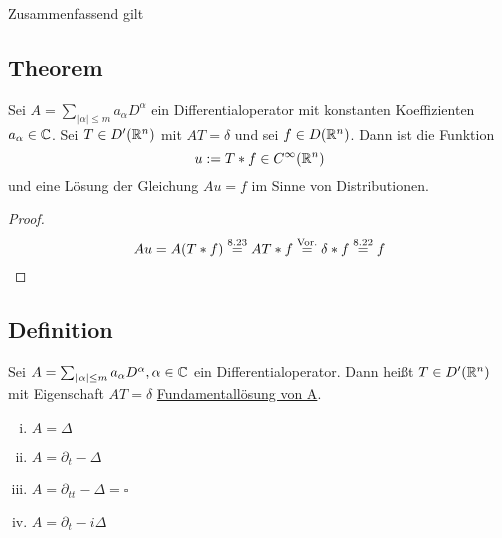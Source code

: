 Zusammenfassend gilt

\subsection{Theorem}

Sei $A = \sum_{|\alpha| \leq m} a_\alpha D^\alpha$ ein Differentialoperator mit konstanten Koeffizienten $a_\alpha \in \mathbb{C}$.
Sei $T \in D'(\mathbb{R}^n)$ mit $AT = \delta$ und sei $f \in D(\mathbb{R}^n)$.
Dann ist die Funktion 
$$
u := T \ast f \in C^\infty(\mathbb{R}^n)
$$
und eine Lösung der Gleichung $Au = f$ im Sinne von Distributionen.


\begin{proof}
  $$ Au = A(T \ast f) \overset{\text{8.23}}{=} AT \ast f \overset{\text{Vor.}}{=} \delta \ast f \overset{\text{8.22}}{=} f \qedhere$$
\end{proof}

\subsection{Definition}

Sei $A = \sum_{|\alpha| \leq m} a_\alpha D^\alpha, \alpha \in \mathbb{C}$ ein Differentialoperator. Dann heißt $T \in D'(\mathbb{R}^n)$ mit Eigenschaft $AT = \delta$ \underline{Fundamentallösung von A}.

\begin{ex}
  \begin{enumerate}[i)]
    \item $A = \Delta$
    \item $A = \partial_t - \Delta$
    \item $A = \partial_{tt} - \Delta = \square $
    \item $A = \partial_t - i\Delta$
  \end{enumerate}
\end{ex}
